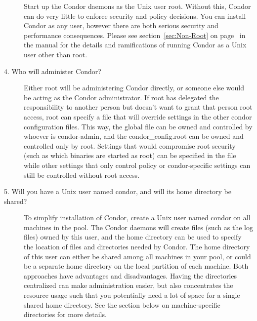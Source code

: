 \begin{description}
Start up the Condor daemons as the Unix user root.
Without this,
Condor can do very little to enforce security and policy
decisions.
You can install Condor as any user,
however there are both serious security and performance consequences.
Please see section~\ref{sec:Non-Root} on page~\pageref{sec:Non-Root}
in the manual for the details and ramifications of
running Condor as a Unix user other than root.

\item[4. Who will administer Condor?]



Either root will be administering Condor directly, or someone else
would be acting as the Condor administrator.  If root has delegated
the responsibility to another person but doesn't want to grant that
person root access, root can specify a 
 file that
will override settings in the other condor configuration
files.  This way,
the global 
 file can be owned and controlled by whoever
is condor-admin, and the 
condor\_config.root can be owned and
controlled only by root.  Settings that would compromise root security
(such as which binaries are started as root) can be specified in the
 file while other settings that only control policy
or condor-specific settings can still be controlled without root
access.  


\item[5. Will you have a Unix user named condor, and will its home
directory be shared?]

To simplify installation of Condor,
create a Unix user named condor on all machines in the pool.
The Condor daemons will create files
(such as the log files) owned by this user,
and the home directory can be used to specify the location of files
and directories needed by Condor.  The home directory of this user can
either be shared among all machines in your pool, or could be a
separate home directory on the local partition of each machine.  Both
approaches have advantages and disadvantages.  Having the directories
centralized can make administration easier, but also concentrates the
resource usage such that you potentially need a lot of space for a
single shared home directory.  See the section below on
machine-specific directories for more details.


\end{description}
